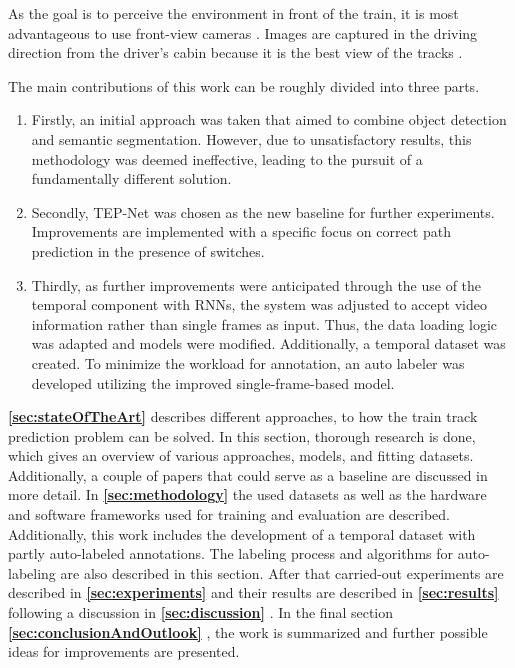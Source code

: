 As the goal is to perceive the environment in front of the train, it is most advantageous to use front-view cameras \cite{tepNet2024} \cite{railNet2019}.
Images are captured in the driving direction from the driver's cabin because it is the best view of the tracks \cite{tepNet2024}.

The main contributions of this work can be roughly divided into three parts.

\begin{enumerate}
    \item Firstly, an initial approach was taken that aimed to combine object detection and semantic segmentation.
    However, due to unsatisfactory results, this methodology was deemed ineffective, leading to the pursuit of a fundamentally different solution.
    \item Secondly, TEP-Net \cite{tepNet2024} was chosen as the new baseline for further experiments.
    Improvements are implemented with a specific focus on correct path prediction in the presence of switches.
    \item Thirdly, as further improvements were anticipated through the use of the temporal component with RNNs, the system was adjusted to accept video information rather than single frames as input.
    Thus, the data loading logic was adapted and models were modified.
    Additionally, a temporal dataset was created.
    To minimize the workload for annotation, an auto labeler was developed utilizing the improved single-frame-based model.
\end{enumerate}

\vspace{2cm} %

\textbf{\ref{sec:stateOfTheArt}} \textbf{} describes different approaches, to how the train track prediction problem can be solved.
In this section, thorough research is done, which gives an overview of various approaches, models, and fitting datasets.
Additionally, a couple of papers that could serve as a baseline are discussed in more detail.
In \textbf{\ref{sec:methodology}} \textbf{} the used datasets as well as the hardware and software frameworks used for training and evaluation are described.
Additionally, this work includes the development of a temporal dataset with partly auto-labeled annotations.
The labeling process and algorithms for auto-labeling are also described in this section.
After that carried-out experiments are described in \textbf{\ref{sec:experiments}} \textbf{} and their results are described in \textbf{\ref{sec:results}} \textbf{} following a discussion in \textbf{\ref{sec:discussion}} \textbf{}.
In the final section \textbf{\ref{sec:conclusionAndOutlook}} \textbf{}, the work is summarized and further possible ideas for improvements are presented.

